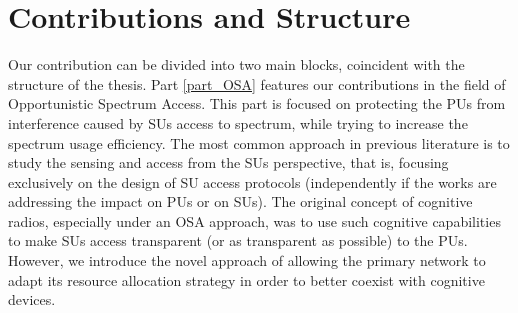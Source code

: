 \section{Contributions and Structure}

Our contribution can be divided into two main blocks, coincident with the structure of the thesis. 
Part \ref{part_OSA} features our contributions in the field of Opportunistic Spectrum Access. 
This part is focused on protecting the PUs from interference caused by SUs access to spectrum, while trying to increase the spectrum usage efficiency. 
The most common approach in previous literature is to study the sensing and access from the SUs perspective, that is, focusing exclusively on the design of SU access protocols (independently if the works are addressing the impact on PUs or on SUs).
The original concept of cognitive radios, especially under an OSA approach, was to use such cognitive capabilities to make SUs access transparent (or as transparent as possible) to the PUs. 
However, we introduce the novel approach of allowing the primary network to adapt its resource allocation strategy in order to better coexist with cognitive devices. 

